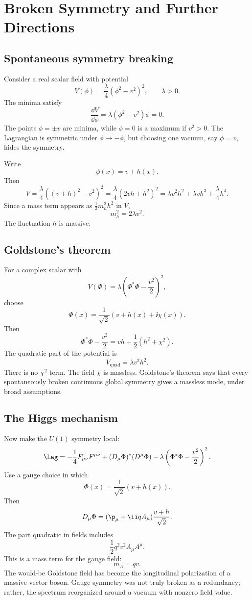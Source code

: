 \chapter{Broken Symmetry and Further Directions}

\section{Spontaneous symmetry breaking}

Consider a real scalar field with potential
\[
  V(\phi)=\frac{\lambda}{4}(\phi^2-v^2)^2,
  \qquad \lambda>0.
\]
The minima satisfy
\[
  \frac{\dd V}{\dd\phi}
  =
  \lambda(\phi^2-v^2)\phi=0.
\]
The points \(\phi=\pm v\) are minima, while \(\phi=0\) is a maximum if \(v^2>0\).  The Lagrangian is symmetric under \(\phi\to-\phi\), but choosing one vacuum, say \(\phi=v\), hides the symmetry.

Write
\[
  \phi(x)=v+h(x).
\]
Then
\[
  V=\frac{\lambda}{4}\left((v+h)^2-v^2\right)^2
  =
  \frac{\lambda}{4}(2vh+h^2)^2
  =
  \lambda v^2h^2+\lambda vh^3+\frac{\lambda}{4}h^4.
\]
Since a mass term appears as \(\frac12m_h^2h^2\) in \(V\),
\[
  m_h^2=2\lambda v^2.
\]
The fluctuation \(h\) is massive.

\section{Goldstone's theorem}

For a complex scalar with
\[
  V(\Phi)=\lambda\left(\Phi^*\Phi-\frac{v^2}{2}\right)^2,
\]
choose
\[
  \Phi(x)=\frac1{\sqrt2}(v+h(x)+\ii\chi(x)).
\]
Then
\[
  \Phi^*\Phi-\frac{v^2}{2}
  =
  vh+\frac12(h^2+\chi^2).
\]
The quadratic part of the potential is
\[
  V_{\text{quad}}=\lambda v^2h^2.
\]
There is no \(\chi^2\) term.  The field \(\chi\) is massless.  Goldstone's theorem says that every spontaneously broken continuous global symmetry gives a massless mode, under broad assumptions.

\section{The Higgs mechanism}

Now make the \(U(1)\) symmetry local:
\[
  \Lag=
  -\frac14F_{\mu\nu}F^{\mu\nu}
  +(D_\mu\Phi)^*(D^\mu\Phi)
  -\lambda\left(\Phi^*\Phi-\frac{v^2}{2}\right)^2.
\]
Use a gauge choice in which
\[
  \Phi(x)=\frac1{\sqrt2}(v+h(x)).
\]
Then
\[
  D_\mu\Phi=(\p_\mu+\ii qA_\mu)\frac{v+h}{\sqrt2}.
\]
The part quadratic in fields includes
\[
  \frac12q^2v^2A_\mu A^\mu.
\]
This is a mass term for the gauge field:
\[
  m_A=qv.
\]
The would-be Goldstone field has become the longitudinal polarization of a massive vector boson.  Gauge symmetry was not truly broken as a redundancy; rather, the spectrum reorganized around a vacuum with nonzero field value.

